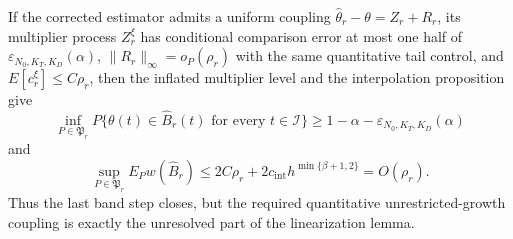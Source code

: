 If the corrected estimator admits a uniform coupling \(\widehat\theta_r-\theta=Z_r+R_r\), its multiplier process \(Z_r^\xi\) has conditional comparison error at most one half of \(\varepsilon_{N_0,K_T,K_D}(\alpha)\), \(\|R_r\|_\infty=o_P(\rho_r)\) with the same quantitative tail control, and \(E[c_r^\xi]\le C\rho_r\), then the inflated multiplier level and the interpolation proposition give
\[
 \inf_{P\in\mathfrak P_r}P\{\theta(t)\in\widehat B_r(t)
 \text{ for every }t\in\mathcal I\}
 \ge1-\alpha-\varepsilon_{N_0,K_T,K_D}(\alpha)
\]
and
\[
 \sup_{P\in\mathfrak P_r}E_Pw(\widehat B_r)
 \le2C\rho_r+2c_{\mathrm{int}}h^{\min\{\beta+1,2\}}=O(\rho_r).
\]
Thus the last band step closes, but the required quantitative unrestricted-growth coupling is exactly the unresolved part of the linearization lemma.